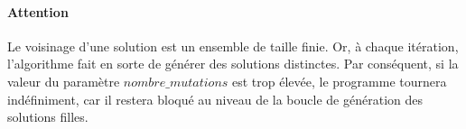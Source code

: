 \paragraph{Attention}
Le voisinage d'une solution est un ensemble de taille finie. Or, à chaque itération, l'algorithme fait en sorte de générer des solutions distinctes.
Par conséquent, si la valeur du paramètre $ nombre\_mutations $ est trop élevée, le programme tournera indéfiniment, car il restera bloqué
au niveau de la boucle de génération des solutions filles.
